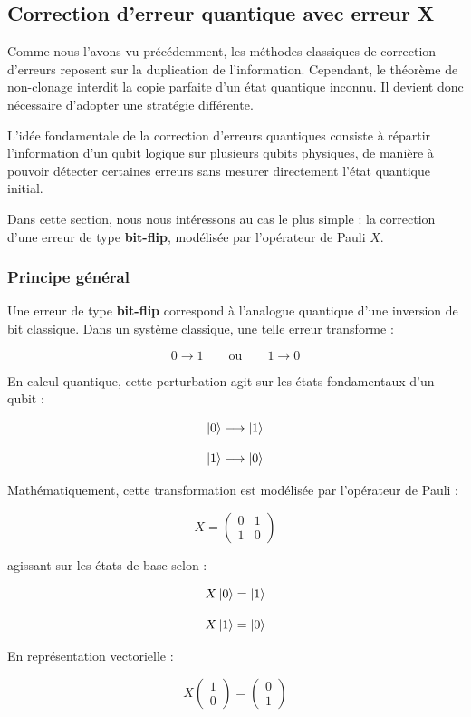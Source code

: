 \documentclass[a4paper,12pt]{article}
\begin{document}
\subsection{Correction d'erreur quantique avec erreur X}

Comme nous l’avons vu précédemment, les méthodes classiques de correction d’erreurs reposent sur la duplication de l’information. Cependant, le théorème de non-clonage interdit la copie parfaite d’un état quantique inconnu. Il devient donc nécessaire d’adopter une stratégie différente.

L’idée fondamentale de la correction d’erreurs quantiques consiste à répartir l’information d’un qubit logique sur plusieurs qubits physiques, de manière à pouvoir détecter certaines erreurs sans mesurer directement l’état quantique initial.

Dans cette section, nous nous intéressons au cas le plus simple : la correction d’une erreur de type \textbf{bit-flip}, modélisée par l’opérateur de Pauli $X$.

\subsubsection{Principe général}

Une erreur de type \textbf{bit-flip} correspond à l’analogue quantique d’une inversion de bit classique. Dans un système classique, une telle erreur transforme :

\[
0
\longrightarrow
1
\qquad
\text{ou}
\qquad
1
\longrightarrow
0
\]

En calcul quantique, cette perturbation agit sur les états fondamentaux d’un qubit :

\[
\ket{0}
\longrightarrow
\ket{1}
\]

\[
\ket{1}
\longrightarrow
\ket{0}
\]

Mathématiquement, cette transformation est modélisée par l’opérateur de Pauli :

\[
X
=
\begin{pmatrix}
0&1\\
1&0
\end{pmatrix}
\]

agissant sur les états de base selon :

\[
X\ket{0}
=
\ket{1}
\]

\[
X\ket{1}
=
\ket{0}
\]

En représentation vectorielle :

\[
X
\begin{pmatrix}
1\\
0
\end{pmatrix}
=
\begin{pmatrix}
0\\
1
\end{pmatrix}
\]
\end{document}
